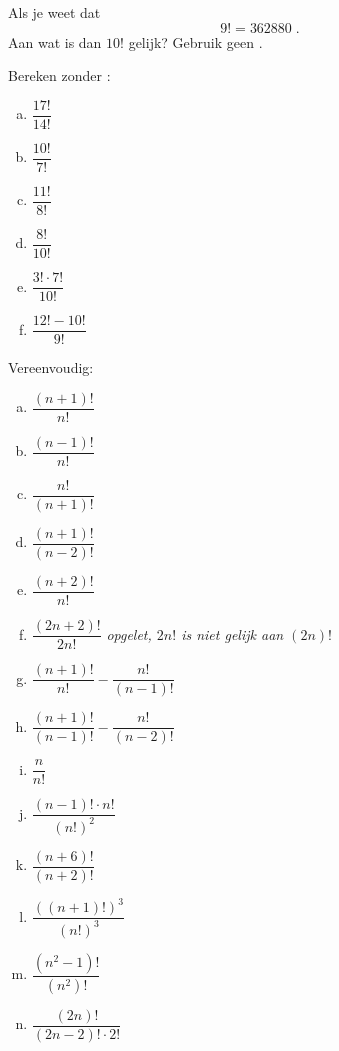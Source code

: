 \documentclass[12pt,twoside]{article}
\begin{document}
\begin{oefening}
Als je weet dat
$$9!=362880\;.$$
Aan wat is dan $10!$ gelijk? Gebruik geen .
\end{oefening}

\begin{oefening}
Bereken zonder :
\begin{multicols}{3}
\begin{enumerate}[(a)]
  \itemsep0.7em
  \item $\dfrac{17!}{14!}$
  \item $\dfrac{10!}{7!}$
  \item $\dfrac{11!}{8!}$
  \item $\dfrac{8!}{10!}$
  \item $\dfrac{3!\cdot 7!}{10!}$
  \item $\dfrac{12!-10!}{9!}$
\end{enumerate}
\end{multicols}
\end{oefening}

\begin{oefening}
Vereenvoudig:
\begin{multicols}{2}
\begin{enumerate}[(a)]
  \itemsep0.7em
  \item $\dfrac{(n+1)!}{n!}$
  \item $\dfrac{(n-1)!}{n!}$
  \item $\dfrac{n!}{(n+1)!}$
  \item $\dfrac{(n+1)!}{(n-2)!}$
  \item $\dfrac{(n+2)!}{n!}$
  \item $\dfrac{(2n+2)!}{2n!}$ \hfill {\em\scriptsize opgelet, $2n!$ is niet gelijk aan $(2n)!$}
  \item $\dfrac{(n+1)!}{n!}-\dfrac{n!}{(n-1)!}$
  \item $\dfrac{(n+1)!}{(n-1)!}-\dfrac{n!}{(n-2)!}$
  \item $\dfrac{n}{n!}$  
  \item $\dfrac{(n-1)!\cdot n!}{(n!)^2}$  
  \item $\dfrac{(n+6)!}{(n+2)!}$  
  \item $\dfrac{\left(\left(n+1\right)!\right)^3}{(n!)^3}$  
  \item $\dfrac{(n^2-1)!}{(n^2)!}$  
  \item $\dfrac{(2n)!}{(2n-2)!\cdot 2!}$  
\end{enumerate}
\end{multicols}
\end{oefening}
\end{document}
